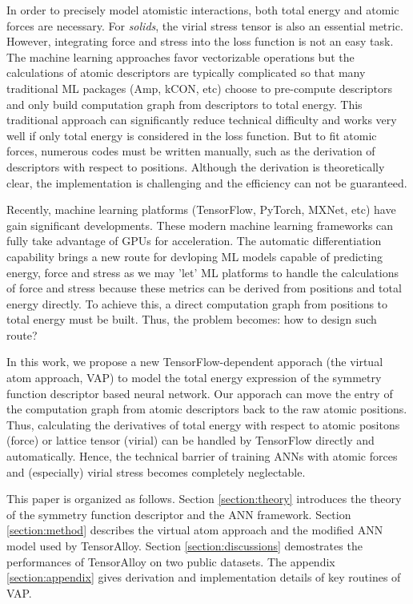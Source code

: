 \documentclass[final,1p,times]{elsarticle}
\begin{document}
In order to precisely model atomistic interactions, both total energy and atomic 
forces are necessary. For \textit{solids}, the virial stress tensor is also an
essential metric. However, integrating force and stress into the loss function 
is not an easy task. The machine learning approaches favor vectorizable 
operations but the calculations of atomic descriptors are typically complicated 
so that many traditional ML packages (Amp, kCON, etc) choose to pre-compute 
descriptors and only build computation graph from descriptors to total energy. 
This traditional approach can significantly reduce technical difficulty and 
works very well if only total energy is considered in the loss function. But to 
fit atomic forces, numerous codes must be written manually, such as the 
derivation of descriptors with respect to positions. Although the derivation is 
theoretically clear, the implementation is challenging and the efficiency can 
not be guaranteed.

Recently, machine learning platforms (TensorFlow\cite{tensorflow}, 
PyTorch\cite{pytorch}, MXNet\cite{MXNet}, etc) have gain significant 
developments. These modern machine learning frameworks can fully take advantage 
of GPUs for acceleration. The automatic differentiation capability brings a new 
route for devloping ML models capable of predicting energy, force and stress as 
we may 'let' ML platforms to handle the calculations of force and stress because 
these metrics can be derived from positions and total energy directly. To 
achieve this, a direct computation graph from positions to total energy must be
built. Thus, the problem becomes: how to design such route?

In this work, we propose a new TensorFlow-dependent apporach (the virtual atom 
approach, VAP) to model the total energy expression of the symmetry function 
descriptor based neural network. 
Our apporach can move the entry of the computation graph from atomic descriptors 
back to the raw atomic positions. Thus, calculating the derivatives of total 
energy with respect to atomic positons (force) or lattice tensor (virial) can be 
handled by TensorFlow directly and automatically. Hence, the technical barrier 
of training ANNs with atomic forces and (especially) virial stress becomes 
completely neglectable.

This paper is organized as follows. Section \ref{section:theory} introduces the 
theory of the symmetry function descriptor and the ANN framework. Section 
\ref{section:method} describes the virtual atom approach and the modified ANN 
model used by TensorAlloy. Section \ref{section:discussions} demostrates 
the performances of TensorAlloy on two public datasets. The appendix 
\ref{section:appendix} gives derivation and implementation details of key 
routines of VAP. 
\end{document}
